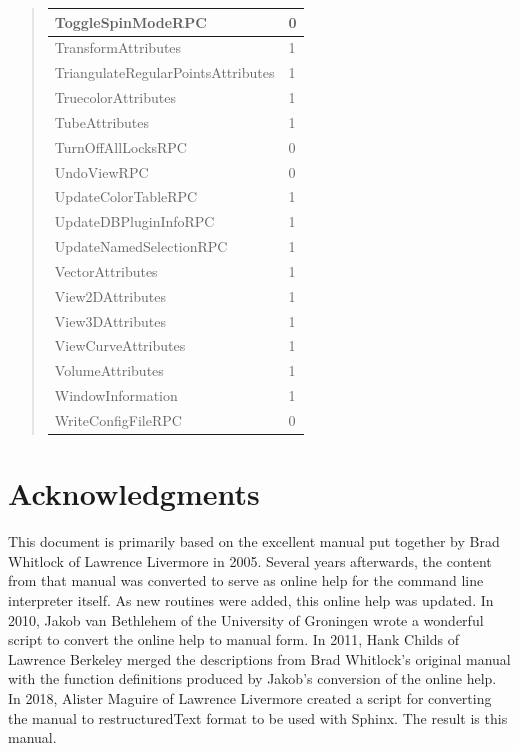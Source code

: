\documentclass[letterpaper,10pt,english]{sphinxmanual}
\begin{document}
\begin{quote}
\begin{longtable}{|l|l|}
\hline
ToggleSpinModeRPC
 & 
0
\\
\hline
TransformAttributes
 & 
1
\\
\hline
TriangulateRegularPointsAttributes
 & 
1
\\
\hline
TruecolorAttributes
 & 
1
\\
\hline
TubeAttributes
 & 
1
\\
\hline
TurnOffAllLocksRPC
 & 
0
\\
\hline
UndoViewRPC
 & 
0
\\
\hline
UpdateColorTableRPC
 & 
1
\\
\hline
UpdateDBPluginInfoRPC
 & 
1
\\
\hline
UpdateNamedSelectionRPC
 & 
1
\\
\hline
VectorAttributes
 & 
1
\\
\hline
View2DAttributes
 & 
1
\\
\hline
View3DAttributes
 & 
1
\\
\hline
ViewCurveAttributes
 & 
1
\\
\hline
VolumeAttributes
 & 
1
\\
\hline
WindowInformation
 & 
1
\\
\hline
WriteConfigFileRPC
 & 
0
\\
\hline\end{longtable}

\end{quote}

\begin{DUlineblock}{0em}
\item[] 
\end{DUlineblock}


\chapter{Acknowledgments}
\label{acknowledgments::doc}\label{acknowledgments:visit}\label{acknowledgments:acknowledgments}
This document is primarily based on the excellent manual put together by
Brad Whitlock of Lawrence Livermore in 2005. Several years afterwards,
the content from that manual was converted to serve as online help for
the command line interpreter itself. As new routines were added, this
online help was updated. In 2010, Jakob van Bethlehem of the University
of Groningen wrote a wonderful script to convert the online help to
manual form. In 2011, Hank Childs of Lawrence Berkeley merged the
descriptions from Brad Whitlock’s original manual with the function
definitions produced by Jakob’s conversion of the online help. In
2018, Alister Maguire of Lawrence Livermore created a script for converting
the manual to restructuredText format to be used with Sphinx. The
result is this manual.



\renewcommand{\indexname}{Index}
\printindex
\end{document}
